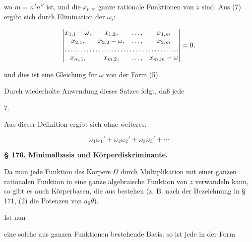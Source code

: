 wo $m = n'n''$ ist, und die $x_{\nu,\nu'}$ ganze rationale Funktionen von $z$
sind. Aus (7) ergibt sich durch Elimination der $\omega_i$:

\[
\begin{vmatrix}
x_{1,1} - \omega, & x_{1,2}, & \ldots, & x_{1,m} \\
x_{2,1}, & x_{2,2} - \omega, & \ldots, & x_{2,m} \\
\hdotsfor{4} \\
x_{m,1}, & x_{m,2}, & \ldots, & x_{m,m} - \omega
\end{vmatrix} = 0,
\]

und dies ist eine Gleichung für $\omega$ von der Form (5).

Durch wiederholte Anwendung dieses Satzes folgt, daß jede

7. 



Aus dieser Definition ergibt sich ohne weiteres:




\[
\omega_1 \omega_1' + \omega_2 \omega_2' + \omega_3 \omega_3' + \cdots
\]


\begin{center}
\textbf{§ 176. Minimalbasis und Körperdiskriminante.}
\end{center}

Da man jede Funktion des Körpers $\Omega$ durch Multiplikation
mit einer ganzen rationalen Funktion in eine ganze algebraische
Funktion von $z$ verwandeln kann, so gibt es auch Körperbasen,
die aus  bestehen (z. B. nach der Bezeichnung
 in § 171, (2) die Potenzen von $a_0 \theta$).

Ist nun


eine solche aus ganzen Funktionen bestehende Basis, so ist jede
in der Form

